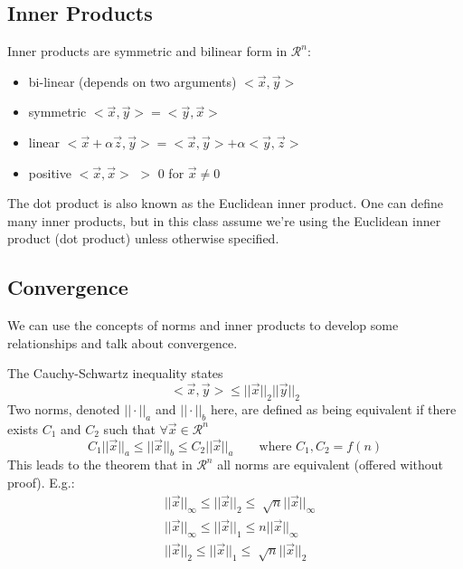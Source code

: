 \documentclass[12pt]{article}
\begin{document}
\subsection{Inner Products}
Inner products are symmetric and bilinear form in $\mathcal{R}^n$:
%
\begin{itemize}
\item bi-linear (depends on two arguments) $< \vec{x}, \vec{y} >$
\item symmetric $< \vec{x}, \vec{y} > = < \vec{y}, \vec{x} >$
\item linear $< \vec{x} + \alpha \vec{z}, \vec{y} > = < \vec{x}, \vec{y} > + \alpha < \vec{y}, \vec{z} >$
\item positive $< \vec{x}, \vec{x} >$ $>$ 0 for $\vec{x} \neq 0$
\end{itemize}

The dot product is also known as the Euclidean inner product. One can define many inner products, but in this class assume we're using the Euclidean inner product (dot product) unless otherwise specified. 

\subsection{Convergence}
We can use the concepts of norms and inner products to develop some relationships and talk about convergence. 

The Cauchy-Schwartz inequality states
%
\begin{equation}
< \vec{x}, \vec{y} > \leq ||\vec{x}||_2 ||\vec{y}||_2 \nonumber
\end{equation}
%
Two norms, denoted $|| \cdot ||_a$ and $|| \cdot ||_b$ here, are defined as being equivalent if there exists $C_1$ and $C_2$ such that $\forall \vec{x} \in \mathcal{R}^n$
%
\begin{equation}
C_1 ||\vec{x}||_a \leq ||\vec{x}||_b \leq C_2 ||\vec{x}||_a \qquad \text{where } C_1, C_2 = f(n) \nonumber
\end{equation}
%
This leads to the theorem that in $\mathcal{R}^n$ all norms are equivalent (offered without proof). E.g.:
\begin{align}
& ||\vec{x}||_{\infty} \leq ||\vec{x}||_2 \leq \sqrt[]{n} ||\vec{x}||_{\infty} \nonumber \\
%
& ||\vec{x}||_{\infty} \leq ||\vec{x}||_1 \leq n ||\vec{x}||_{\infty} \nonumber \\
%
& ||\vec{x}||_2 \leq ||\vec{x}||_1 \leq \sqrt[]{n} ||\vec{x}||_2 \nonumber
\end{align}
\end{document}
